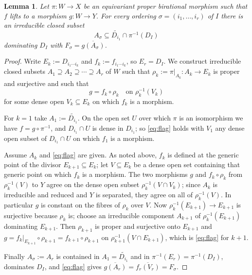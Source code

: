 \documentclass[11pt]{amsart}
\theoremstyle{plain}
\newtheorem{lemma}[theorem]{Lemma}
\theoremstyle{definition}
\theoremstyle{remark}
\numberwithin{equation}{section}
\begin{document}
\begin{lemma} \label{lem:flag}
Let $\pi : W \to X$ be an equivariant proper birational morphism such that
$f$ lifts to a morphism $g : W \to Y$.  For every ordering
$\sigma = (i_1,\ldots,i_r)$ of $I$ there is an irreducible closed subset
\[
A_\sigma \subseteq \widetilde{D_{i_1}} \cap \pi^{-1}(D_I)
\]
dominating $D_I$ with $F_\sigma = \overline{g(A_\sigma)}$.
\end{lemma}

\begin{proof}
Write $E_k := D_{i_1 \cdots i_k}$ and $f_k := f_{i_1 \cdots i_k}$, so
$E_r = D_I$.  We construct irreducible closed subsets
$A_1 \supseteq A_2 \supseteq \cdots \supseteq A_r$ of $W$ such that
$\rho_k := \pi|_{A_k} : A_k \to E_k$ is proper and surjective and such that
\begin{equation} \label{eq:flag}
g = f_k \circ \rho_k \quad \text{on } \rho_k^{-1}(V_k)
\end{equation}
for some dense open $V_k \subseteq E_k$ on which $f_k$ is a morphism.

For $k = 1$ take $A_1 := \widetilde{D_{i_1}}$.  On the open set $U$ over
which $\pi$ is an isomorphism we have $f = g \circ \pi^{-1}$, and
$D_{i_1} \cap U$ is dense in $D_{i_1}$; so \eqref{eq:flag} holds with
$V_1$ any dense open subset of $D_{i_1} \cap U$ on which $f_1$ is a
morphism.

Assume $A_k$ and \eqref{eq:flag} are given.  As noted above, $f_k$ is
defined at the generic point of the divisor $E_{k+1} \subseteq E_k$; let
$V \subseteq E_k$ be a dense open set containing that generic point on
which $f_k$ is a morphism.  The two morphisms $g$ and $f_k \circ \rho_k$
from $\rho_k^{-1}(V)$ to $Y$ agree on the dense open subset
$\rho_k^{-1}(V \cap V_k)$; since $A_k$ is irreducible and reduced and $Y$
is separated, they agree on all of $\rho_k^{-1}(V)$.  In particular $g$ is
constant on the fibres of $\rho_k$ over $V$.  Now $\rho_k^{-1}(E_{k+1}) \to
E_{k+1}$ is surjective because $\rho_k$ is; choose an irreducible component
$A_{k+1}$ of $\rho_k^{-1}(E_{k+1})$ dominating $E_{k+1}$.  Then $\rho_{k+1}$
is proper and surjective onto $E_{k+1}$ and
$g = f_k|_{E_{k+1}} \circ \rho_{k+1} = f_{k+1} \circ \rho_{k+1}$ on
$\rho_{k+1}^{-1}(V \cap E_{k+1})$, which is \eqref{eq:flag} for $k+1$.

Finally $A_\sigma := A_r$ is contained in $A_1 = \widetilde{D_{i_1}}$ and in
$\pi^{-1}(E_r) = \pi^{-1}(D_I)$, dominates $D_I$, and \eqref{eq:flag}
gives $\overline{g(A_r)} = \overline{f_r(V_r)} = F_\sigma$.
\end{proof}
\end{document}
